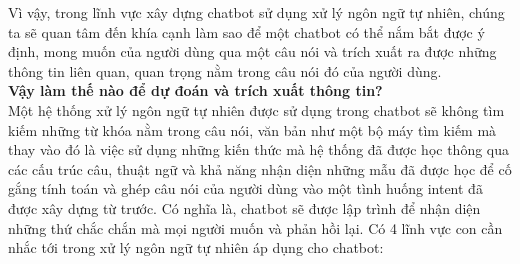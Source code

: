 \documentclass[12pt]{report}
\begin{document}
Vì vậy, trong lĩnh vực xây dựng chatbot sử dụng xử lý ngôn ngữ tự nhiên, chúng ta sẽ quan tâm đến khía cạnh làm sao để một chatbot có thể nắm bắt được ý định, mong muốn của người dùng qua một câu nói và trích xuất ra được những thông tin liên quan, quan trọng nằm trong câu nói đó của người dùng. \\[0.3cm]
\noindent \textbf{Vậy làm thế nào để dự đoán và trích xuất thông tin?\\[0.3cm]}
Một hệ thống xử lý ngôn ngữ tự nhiên được sử dụng trong chatbot sẽ không tìm kiếm những từ khóa nằm trong câu nói, văn bản như một bộ máy tìm kiếm mà thay vào đó là việc sử dụng những kiến thức mà hệ thống đã được học thông qua các cấu trúc câu, thuật ngữ và khả năng nhận diện những mẫu đã được học để cố gắng tính toán và ghép câu nói của người dùng vào một tình huống intent đã được xây dựng từ trước. Có nghĩa là, chatbot sẽ được lập trình để nhận diện những thứ chắc chắn mà mọi người muốn và phản hồi lại. Có 4 lĩnh vực con cần nhắc tới trong xử lý ngôn ngữ tự nhiên áp dụng cho chatbot:
\end{document}
